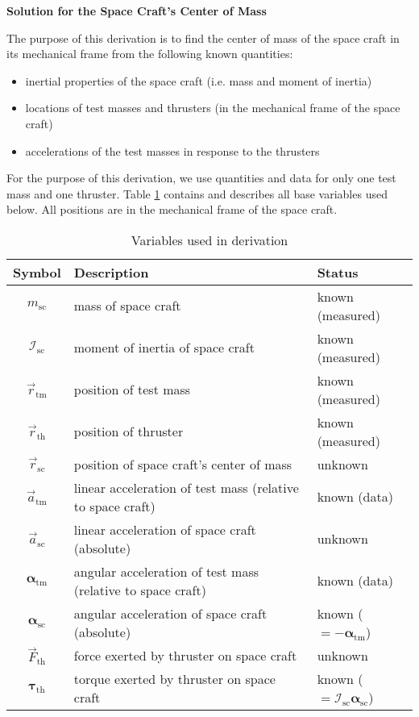 \documentclass[10pt]{article}
\renewcommand{\t}{\text} %
\renewcommand{\v}{\vec} %
\newcommand{\vv}{\boldsymbol} %
\renewcommand{\sc}{_{\t{sc}}}
\renewcommand{\th}{_{\t{th}}}
\newcommand{\tm}{_{\t{tm}}}
\newcommand{\I}{\mathcal{I}} %
\begin{document}
\begin{center}
  \large \bf Solution for the Space Craft's Center of Mass
\end{center}

The purpose of this derivation is to find the center of mass of the
space craft in its mechanical frame from the following known
quantities:
\begin{itemize}
\item inertial properties of the space craft (i.e. mass and moment of
  inertia)
\item locations of test masses and thrusters (in the mechanical frame
  of the space craft)
\item accelerations of the test masses in response to the thrusters
\end{itemize}
For the purpose of this derivation, we use quantities and data for
only one test mass and one thruster. Table \ref{variables} contains
and describes all base variables used below. All positions are in the
mechanical frame of the space craft.

\begin{table}[H]
  \centering
  \caption{Variables used in derivation}
  \begin{tabular}{|c|l|l|} \hline
    Symbol & Description & Status \\ \hline
    $m\sc$ & mass of space craft & known (measured) \\
    $\I\sc$ & moment of inertia of space craft & known (measured) \\
    $\v r\tm$ & position of test mass & known (measured) \\
    $\v r\th$ & position of thruster & known (measured) \\
    $\v r\sc$ & position of space craft's center of mass & unknown \\
    $\v a\tm$ & linear acceleration of test mass (relative to space
    craft) & known (data) \\
    $\v a\sc$ & linear acceleration of space craft (absolute)
    & unknown \\
    $\vv\alpha\tm$ & angular acceleration of test mass (relative to
    space craft) & known (data) \\
    $\vv\alpha\sc$ & angular acceleration of space craft (absolute)
    & known ($=-\vv\alpha\tm$) \\
    $\v F\th$ & force exerted by thruster on space craft & unknown \\
    $\vv\tau\th$ & torque exerted by thruster on space craft &
    known ($=\I\sc\vv\alpha\sc$) \\
    \hline
  \end{tabular}
  \label{variables}
\end{table}
\end{document}
